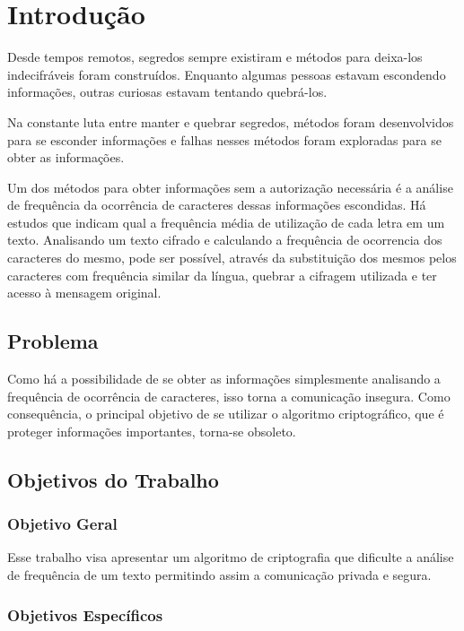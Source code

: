 \chapter{Introdução}
\label{introduction}

Desde tempos remotos, segredos sempre existiram e métodos para deixa-los indecifráveis foram construídos. Enquanto algumas pessoas estavam escondendo informações, outras curiosas estavam tentando quebrá-los. ~\cite{alexander-maximov} %

Na constante luta entre manter e quebrar segredos, métodos foram desenvolvidos para se esconder informações e falhas nesses métodos foram exploradas para se obter as informações. 

Um dos métodos para obter informações sem a autorização necessária é a análise de frequência da ocorrência de caracteres dessas informações escondidas. Há estudos que indicam qual a frequência média de utilização de cada letra em um texto. Analisando um texto cifrado e calculando a frequência de ocorrencia dos caracteres do mesmo, pode ser possível, através da substituição dos mesmos pelos caracteres com frequência similar da língua, quebrar a cifragem utilizada e ter acesso à mensagem original.

\section{Problema}

Como há a possibilidade de se obter as informações simplesmente analisando a frequência de ocorrência de caracteres, isso torna a comunicação insegura. Como consequência, o principal objetivo de se utilizar o algoritmo criptográfico, que é proteger informações importantes, torna-se obsoleto.  

\section{Objetivos do Trabalho}
\label{paper-objectives}

\subsection{Objetivo Geral}
\label{general-objective}
Esse trabalho visa apresentar um algoritmo de criptografia que dificulte a análise de frequência de um texto permitindo assim a comunicação privada e segura.

\subsection{Objetivos Específicos}
\label{specifics-objectives}

